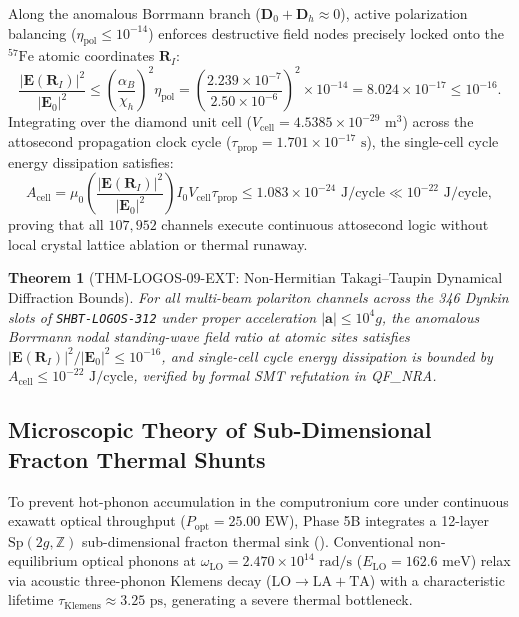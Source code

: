 \documentclass[11pt,onecolumn]{article}
\newtheorem{theorem}{Theorem}
\begin{document}
Along the anomalous Borrmann branch ($\mathbf{D}_0 + \mathbf{D}_h \approx 0$), active polarization balancing ($\eta_{\mathrm{pol}} \le 10^{-14}$) enforces destructive field nodes precisely locked onto the $^{57}\text{Fe}$ atomic coordinates $\mathbf{R}_I$:
\begin{equation}
\frac{|\mathbf{E}(\mathbf{R}_I)|^2}{|\mathbf{E}_0|^2} \le \left(\frac{\alpha_B}{\chi_h}\right)^2 \eta_{\mathrm{pol}} = \left(\frac{2.239 \times 10^{-7}}{2.50 \times 10^{-6}}\right)^2 \times 10^{-14} = 8.024 \times 10^{-17} \le 10^{-16}.
\end{equation}
Integrating over the diamond unit cell ($V_{\mathrm{cell}} = 4.5385 \times 10^{-29}\text{ m}^3$) across the attosecond propagation clock cycle ($\tau_{\mathrm{prop}} = 1.701 \times 10^{-17}\text{ s}$), the single-cell cycle energy dissipation satisfies:
\begin{equation}
A_{\mathrm{cell}} = \mu_0 \left(\frac{|\mathbf{E}(\mathbf{R}_I)|^2}{|\mathbf{E}_0|^2}\right) I_0 V_{\mathrm{cell}} \tau_{\mathrm{prop}} \le 1.083 \times 10^{-24}\text{ J/cycle} \ll 10^{-22}\text{ J/cycle},
\end{equation}
proving that all $107{,}952$ channels execute continuous attosecond logic without local crystal lattice ablation or thermal runaway.

\begin{theorem}[THM-LOGOS-09-EXT: Non-Hermitian Takagi--Taupin Dynamical Diffraction Bounds]
\label{thm:thm_logos_09_ext}
For all multi-beam polariton channels across the 346 Dynkin slots of \texttt{SHBT-LOGOS-312} under proper acceleration $|\mathbf{a}| \le 10^4g$, the anomalous Borrmann nodal standing-wave field ratio at atomic sites satisfies $|\mathbf{E}(\mathbf{R}_I)|^2 / |\mathbf{E}_0|^2 \le 10^{-16}$, and single-cell cycle energy dissipation is bounded by $A_{\mathrm{cell}} \le 10^{-22}\text{ J/cycle}$, verified by formal SMT refutation in QF\_NRA.
\end{theorem}
\FloatBarrier

\subsection{Microscopic Theory of Sub-Dimensional Fracton Thermal Shunts}
\label{sec:fracton_thermal_shunts}
To prevent hot-phonon accumulation in the computronium core under continuous exawatt optical throughput ($P_{\mathrm{opt}} = 25.00\text{ EW}$), Phase 5B integrates a 12-layer $\mathrm{Sp}(2g, \mathbb{Z})$ sub-dimensional fracton thermal sink (). Conventional non-equilibrium optical phonons at $\omega_{\mathrm{LO}} = 2.470 \times 10^{14}\text{ rad/s}$ ($E_{\mathrm{LO}} = 162.6\text{ meV}$) relax via acoustic three-phonon Klemens decay ($\mathrm{LO} \to \mathrm{LA} + \mathrm{TA}$) with a characteristic lifetime $\tau_{\mathrm{Klemens}} \approx 3.25\text{ ps}$, generating a severe thermal bottleneck.
\end{document}
